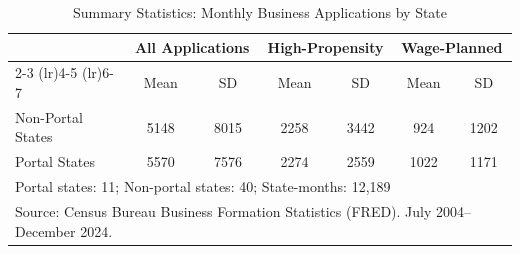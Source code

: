 \begin{table}[htbp]
\centering
\caption{Summary Statistics: Monthly Business Applications by State}
\label{tab:summary}
\begin{tabular}{lcccccc}
\hline\hline
 & \multicolumn{2}{c}{All Applications} & \multicolumn{2}{c}{High-Propensity} & \multicolumn{2}{c}{Wage-Planned} \\
\cmidrule(lr){2-3} \cmidrule(lr){4-5} \cmidrule(lr){6-7}
 & Mean & SD & Mean & SD & Mean & SD \\
\hline
Non-Portal States & 5148 & 8015 & 2258 & 3442 & 924 & 1202 \\
Portal States & 5570 & 7576 & 2274 & 2559 & 1022 & 1171 \\
\hline
\multicolumn{7}{l}{\footnotesize Portal states: 11; Non-portal states: 40; State-months: 12,189} \\
\multicolumn{7}{l}{\footnotesize Source: Census Bureau Business Formation Statistics (FRED). July 2004--December 2024.} \\
\hline\hline
\end{tabular}
\end{table}

